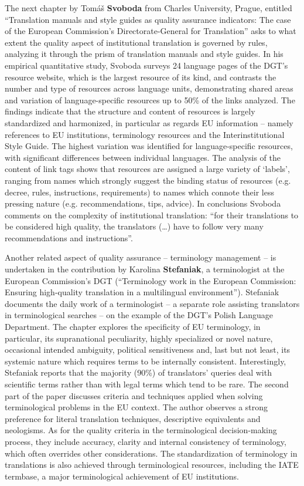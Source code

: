 \documentclass[output=paper]{langsci/langscibook}
\begin{document}
The next chapter by Tomáš \textbf{Svoboda} from Charles University, Prague, entitled “Translation manuals and style guides as quality assurance indicators: The case of the European Commission’s Directorate-General for Translation” asks to what extent the quality aspect of institutional translation is governed by rules, analyzing it through the prism of translation manuals and style guides. In his empirical quantitative study, Svoboda surveys 24 language pages of the DGT’s resource website, which is the largest resource of its kind, and contrasts the number and type of resources across language units, demonstrating shared areas and variation of language-specific resources up to 50\% of the links analyzed. The findings indicate that the structure and content of resources is largely standardized and harmonized, in particular as regards EU information – namely references to EU institutions, terminology resources and the Interinstitutional Style Guide. The highest variation was identified for language-specific resources, with significant differences between individual languages. The analysis of the content of link tags shows that resources are assigned a large variety of ‘labels’, ranging from names which strongly suggest the binding status of resources (e.g. decree, rules, instructions, requirements) to names which connote their less pressing nature (e.g. recommendations, tips, advice). In conclusions Svoboda comments on the complexity of institutional translation: “for their translations to be considered high quality, the translators (…) have to follow very many recommendations and instructions”.

Another related aspect of quality assurance – terminology management – is undertaken in the contribution by Karolina \textbf{Stefaniak}, a terminologist at the European Commission’s DGT (“Terminology work in the European Commission: Ensuring high-quality translation in a multilingual environment”). Stefaniak documents the daily work of a terminologist – a separate role assisting translators in terminological searches – on the example of the DGT’s Polish Language Department. The chapter explores the specificity of EU terminology, in particular, its supranational peculiarity, highly specialized or novel nature, occasional intended ambiguity, political sensitiveness and, last but not least, its systemic nature which requires terms to be internally consistent. Interestingly, Stefaniak reports that the majority (90\%) of translators’ queries deal with scientific terms rather than with legal terms which tend to be rare. The second part of the paper discusses criteria and techniques applied when solving terminological problems in the EU context. The author observes a strong preference for literal translation techniques, descriptive equivalents and neologisms. As for the quality criteria in the terminological decision-making process, they include accuracy, clarity and internal consistency of terminology, which often overrides other considerations. The standardization of terminology in translations is also achieved through terminological resources, including the IATE termbase, a major terminological achievement of EU institutions.
\end{document}
